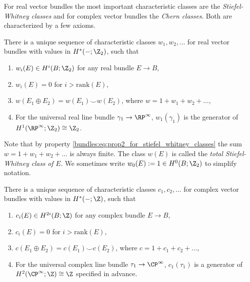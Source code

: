 For real vector bundles the most important characteristic classes are the \textit{Stiefel-Whitney classes} and for complex vector bundles the \textit{Chern classes}. Both are characterized by a few axioms.

\begin{definition}
    \label{bundles:def:Steifel_Whitney_Classes}
    There is a unique sequence of characteristic classes $w_1, w_2, \ldots$ for real vector bundles with values in $H^\ast(-;\Z_2)$, such that 
    \begin{enumerate}[label=(\roman*)]
        \item $w_i(E) \in H^i(B;\Z_2)$ for any real bundle $E \to B$,
        \item \label{bundles:eq:prop2_for_stiefel_whitney_classes} $w_i(E) = 0$ for $i > \mathrm{rank}(E)$,
        \item \label{bundles:eq:prop3_for_stiefel_whitney_classes} $w(E_1 \oplus E_2) = w(E_1) \smile w(E_2)$, where $w = 1 + w_1 + w_2 + \ldots$,
        \item \label{bundles:eq:prop4_for_stiefel_whitney_classes} For the universal real line bundle $\gamma_1 \to \RP^\infty$, $w_1(\gamma_1)$ is the generator of $H^1(\RP^\infty;\Z_2) \cong \Z_2$.
    \end{enumerate}
\end{definition}

Note that by property \ref{bundles:eq:prop2_for_stiefel_whitney_classes} the sum $w = 1 + w_1 + w_2 + \ldots$ is always finite. The class $w(E)$ is called the \textit{total Stiefel-Whitney class of $E$}. We sometimes write $w_0(E) := 1 \in H^0(B;\Z_2)$ to simplify notation.

\begin{definition}
    There is a unique sequence of characteristic classes $c_1, c_2, \ldots$ for complex vector bundles with values in $H^\ast(-;\Z)$, such that 
    \begin{enumerate}[label=(\roman*)]
        \item $c_i(E) \in H^{2i}(B;\Z)$ for any complex bundle $E \to B$,
        \item $c_i(E) = 0$ for $i > \mathrm{rank}(E)$,
        \item $c(E_1 \oplus E_2) = c(E_1) \smile c(E_2)$, where $c = 1 + c_1 + c_2 + \ldots$,
        \item For the universal complex line bundle $\tau_1 \to \CP^\infty$, $c_1(\tau_1)$ is a generator of $H^2(\CP^\infty;\Z) \cong \Z$ specified in advance.
    \end{enumerate}
\end{definition}

